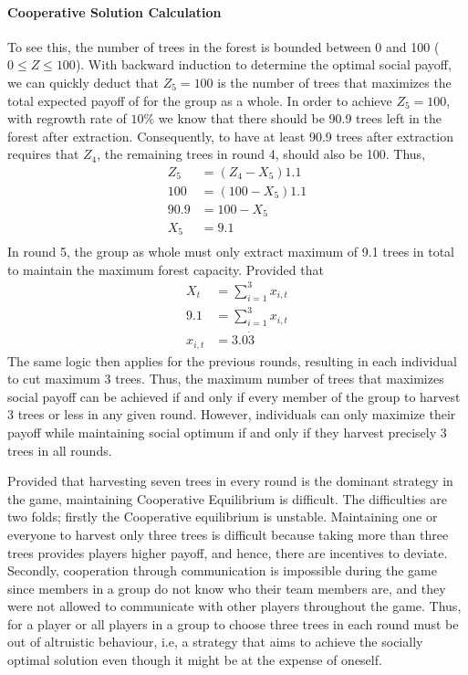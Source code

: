 \paragraph{Cooperative Solution Calculation}
 To see this, the number of trees in the forest is bounded between 0 and 100 ($0\leq Z \leq 100$). With backward induction to determine the optimal social payoff, we can quickly deduct that $Z_5=100$ is the number of trees that maximizes the total expected payoff of for the group as a whole. In order to achieve $Z_5=100$, with regrowth rate of $10\%$ we know that there should be 90.9 trees left in the forest after extraction. Consequently, to have at least 90.9 trees after extraction requires that $Z_4$, the remaining trees in round 4, should also be 100. Thus,
\begin{align*}
    Z_5 &= (Z_4 - X_5)1.1 \\
    100 &= (100 - X_5)1.1 \\
    90.9 &= 100 - X_5 \\
    X_5 &= 9.1 \\
\end{align*}
In round 5, the group as whole must only extract maximum of 9.1 trees in total to maintain the maximum forest capacity. Provided that
\begin{align*}
    X_{t} &= \sum_{i=1}^{3} x_{i,t} \\
    9.1 &= \sum_{i=1}^{3} x_{i,t} \\
    x_{i,t} &= 3.0\dot{3}
\end{align*}
The same logic then applies for the previous rounds, resulting in each individual to cut maximum 3 trees. Thus, the maximum number of trees that maximizes social payoff can be achieved if and only if every member of the group to harvest 3 trees or less in any given round. However, individuals can only maximize their payoff while maintaining social optimum if and only if they harvest precisely 3 trees in all rounds.

 Provided that harvesting seven trees in every round is the dominant strategy in the game, maintaining Cooperative Equilibrium is difficult. The difficulties are two folds; firstly the Cooperative equilibrium is unstable. Maintaining one or everyone to harvest only three trees is difficult because taking more than three trees provides players higher payoff, and hence, there are incentives to deviate. Secondly, cooperation through communication is impossible during the game since members in a group do not know who their team members are, and they were not allowed to communicate with other players throughout the game. Thus, for a player or all players in a group to choose three trees in each round must be out of altruistic behaviour, i.e, a strategy that aims to achieve the socially optimal solution even though it might be at the expense of oneself.

